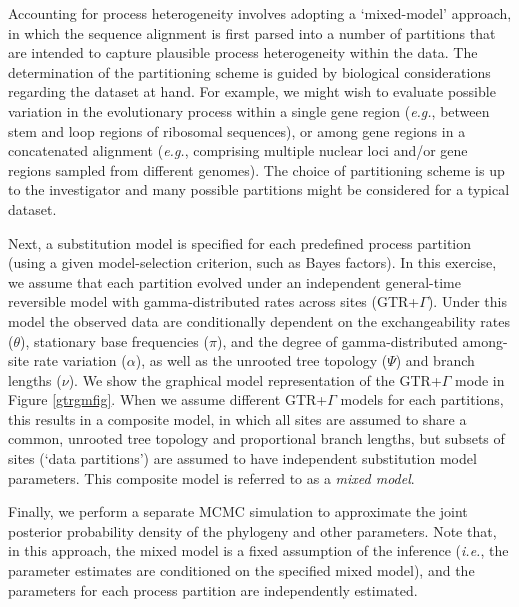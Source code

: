 \documentclass[11pt]{article}
\newcommand{\taha}[1]{{\textcolor{red}{[TAH comment: #1]}}} %
\begin{document}
Accounting for process heterogeneity involves adopting a `mixed-model' approach, \citep{ronquist03} in which the sequence alignment is first parsed into a number of partitions that are intended to capture plausible process heterogeneity within the data.
The determination of the partitioning scheme is guided by biological considerations regarding the dataset at hand.
For example, we might wish to evaluate possible variation in the evolutionary process within a single gene region ({\it e.g.}, between stem and loop regions of ribosomal sequences), or among gene regions in a concatenated alignment ({\it e.g.}, comprising multiple nuclear loci and/or gene regions sampled from different genomes).
The choice of partitioning scheme is up to the investigator and many possible partitions might be considered for a typical dataset.

Next, a substitution model is specified for each predefined process partition (using a given model-selection criterion, such as Bayes factors).
In this exercise, we assume that each partition evolved under an independent general-time reversible model with gamma-distributed rates across sites (GTR+$\Gamma$). 
Under this model the observed data are conditionally dependent on the exchangeability rates ($\theta$), stationary base frequencies ($\pi$), and the degree of gamma-distributed among-site rate variation ($\alpha$), as well as the unrooted tree topology ($\Psi$) and branch lengths ($\nu$).
We show the graphical model representation of the GTR+$\Gamma$ mode in Figure \ref{gtrgmfig}. 
When we assume different GTR+$\Gamma$ models for each partitions, this results in a composite model, in which all sites are assumed to share a common, unrooted tree topology and proportional branch lengths, but subsets of sites (`data partitions') are assumed to have independent substitution model parameters.
This composite model is referred to as a \emph{mixed model}. %



Finally, we perform a separate MCMC simulation to approximate the joint posterior probability density of the phylogeny and other parameters.  Note that, in this approach, the mixed model is a fixed assumption of the inference ({\it i.e.}, the parameter estimates are conditioned on the specified mixed model), and the parameters for each process partition are independently estimated.
\end{document}
